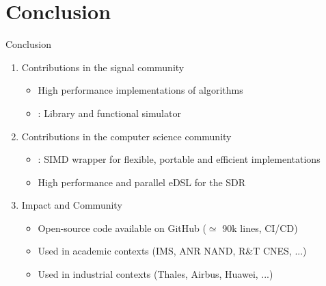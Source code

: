 
\section[Conclusion]{Conclusion}

\begin{frame}{Conclusion}
  \vfill
  \begin{enumerate}
    \item Contributions in the signal community
    \begin{itemize}
      \item High performance implementations of algorithms
      \item \AFFECT: Library and functional simulator
    \end{itemize}
    \vspace{0.3cm}
    \pause
    \item Contributions in the computer science community
    \begin{itemize}
      \item \MIPP: SIMD wrapper for flexible, portable and efficient implementations
      \item High performance and parallel eDSL for the SDR
    \end{itemize}
    \vspace{0.3cm}
    \pause
    \item Impact and Community
    \begin{itemize}
      \item Open-source code available on GitHub ($\simeq $ 90k lines, CI/CD)
      \item Used in academic contexts (IMS, ANR NAND, R\&T CNES, ...)
      \item Used in industrial contexts (Thales, Airbus, Huawei, ...)
    \end{itemize}
  \end{enumerate}
  \vfill
\end{frame}

